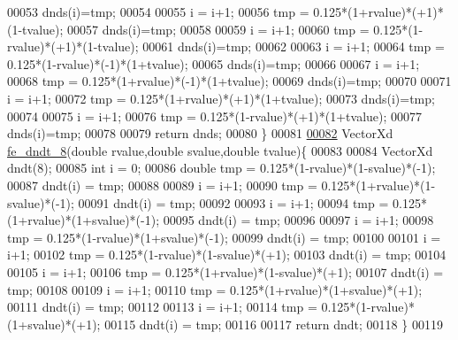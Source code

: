 \begin{DoxyCode}
00053         dnds(i)=tmp;
00054 
00055     i = i+1;
00056          tmp = 0.125*(1+rvalue)*(+1)*(1-tvalue);
00057         dnds(i)=tmp;
00058 
00059     i = i+1;
00060          tmp = 0.125*(1-rvalue)*(+1)*(1-tvalue);
00061     dnds(i)=tmp;
00062 
00063     i = i+1;
00064          tmp = 0.125*(1-rvalue)*(-1)*(1+tvalue);
00065         dnds(i)=tmp;
00066 
00067     i = i+1;
00068          tmp = 0.125*(1+rvalue)*(-1)*(1+tvalue);
00069         dnds(i)=tmp;
00070 
00071     i = i+1;
00072          tmp = 0.125*(1+rvalue)*(+1)*(1+tvalue);
00073         dnds(i)=tmp;
00074 
00075     i = i+1;
00076          tmp = 0.125*(1-rvalue)*(+1)*(1+tvalue);
00077         dnds(i)=tmp;
00078 
00079     \textcolor{keywordflow}{return} dnds;
00080 \}
00081 
\hyperlink{fe__dn__iso__8_8cpp_a57e8e5c9f740c98e4767f29c121c2d0a}{00082} VectorXd \hyperlink{fe__dn__iso__8_8cpp_a57e8e5c9f740c98e4767f29c121c2d0a}{fe\_dndt\_8}(\textcolor{keywordtype}{double} rvalue,\textcolor{keywordtype}{double} svalue,\textcolor{keywordtype}{double} tvalue)\{
00083 
00084     VectorXd dndt(8);
00085     \textcolor{keywordtype}{int} i = 0;
00086     \textcolor{keywordtype}{double} tmp = 0.125*(1-rvalue)*(1-svalue)*(-1);
00087     dndt(i) = tmp;
00088 
00089     i = i+1;
00090      tmp = 0.125*(1+rvalue)*(1-svalue)*(-1);
00091         dndt(i) = tmp;
00092 
00093     i = i+1;
00094          tmp = 0.125*(1+rvalue)*(1+svalue)*(-1);
00095         dndt(i) = tmp;
00096 
00097     i = i+1;
00098          tmp = 0.125*(1-rvalue)*(1+svalue)*(-1);
00099         dndt(i) = tmp;
00100 
00101     i = i+1;
00102          tmp = 0.125*(1-rvalue)*(1-svalue)*(+1);
00103         dndt(i) = tmp;
00104 
00105     i = i+1;
00106          tmp = 0.125*(1+rvalue)*(1-svalue)*(+1);
00107         dndt(i) = tmp;
00108 
00109     i = i+1;
00110          tmp = 0.125*(1+rvalue)*(1+svalue)*(+1);
00111         dndt(i) = tmp;
00112 
00113     i = i+1;
00114          tmp = 0.125*(1-rvalue)*(1+svalue)*(+1);
00115         dndt(i) = tmp;
00116 
00117     \textcolor{keywordflow}{return} dndt;
00118 \}
00119 
\end{DoxyCode}
